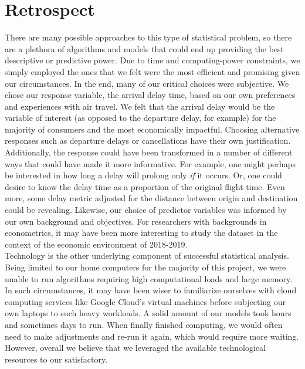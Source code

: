 \documentclass[12pt, a4paper, openany]{book}
\newcommand\tab[1][1cm]{\hspace*{#1}}
\begin{document}
	\section{Retrospect}
	\tab There are many possible approaches to this type of statistical problem, so there are a plethora of algorithms and models that could end up providing the best descriptive or predictive power. Due to time and computing-power constraints, we simply employed the ones that we felt were the most efficient and promising given our circumstances. In the end, many of our critical choices were subjective. We chose our response variable, the arrival delay time, based on our own preferences and experiences with air travel. We felt that the arrival delay would be the variable of interest (as opposed to the departure delay, for example) for the majority of consumers and the most economically impactful. Choosing alternative responses such as departure delays or cancellations have their own justification. Additionally, the response could have been transformed in a number of different ways that could have made it more informative. For example, one might perhaps be interested in how long a delay will prolong only \textit{if} it occurs. Or, one could desire to know the delay time as a proportion of the original flight time. Even more, some delay metric adjusted for the distance between origin and destination could be revealing. Likewise, our choice of predictor variables was informed by our own background and objectives. For researchers with backgrounds in econometrics, it may have been more interesting to study the dataset in the context of the economic environment of 2018-2019. \\
	\tab  Technology is the other underlying component of successful statistical analysis. Being limited to our home computers for the majority of this project, we were unable to run algorithms requiring high computational loads and large memory. In such circumstances, it may have been wiser to familiarize ourselves with cloud computing services like Google Cloud's virtual machines before subjecting our own laptops to such heavy workloads. A solid amount of our models took hours and sometimes days to run. When finally finished computing, we would often need to make adjustments and re-run it again, which would require more waiting. However, overall we believe that we leveraged the available technological resources to our satisfactory.
\end{document}

